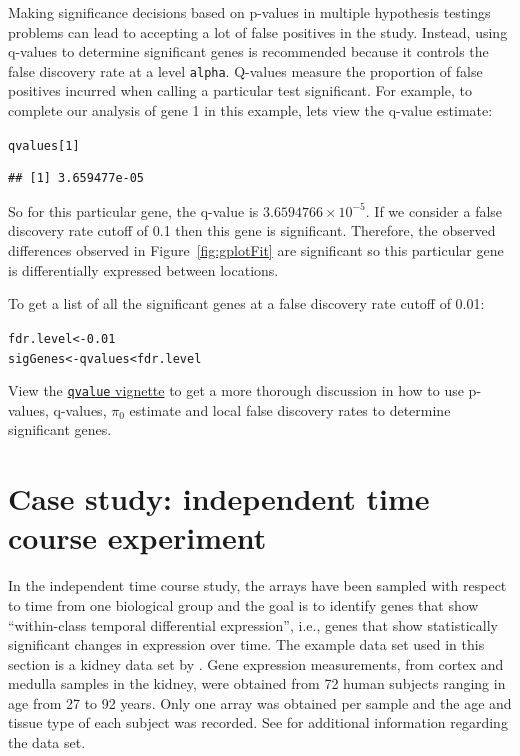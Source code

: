 \documentclass{article}\usepackage[]{graphicx}\usepackage[]{color}
\makeatletter
\newcommand{\hlnum}[1]{\textcolor[rgb]{0.686,0.059,0.569}{#1}}%
\newcommand{\hlopt}[1]{\textcolor[rgb]{0,0,0}{#1}}%
\newcommand{\hlstd}[1]{\textcolor[rgb]{0.345,0.345,0.345}{#1}}%
\newcommand{\hlkwb}[1]{\textcolor[rgb]{0.69,0.353,0.396}{#1}}%
\newenvironment{kframe}{%
 \def\at@end@of@kframe{}%
 \ifinner\ifhmode%
  \def\at@end@of@kframe{\end{minipage}}%
  \begin{minipage}{\columnwidth}%
 \fi\fi%
 \def\FrameCommand##1{\hskip\@totalleftmargin \hskip-\fboxsep
 \colorbox{shadecolor}{##1}\hskip-\fboxsep
     \hskip-\linewidth \hskip-\@totalleftmargin \hskip\columnwidth}%
 \MakeFramed {\advance\hsize-\width
   \@totalleftmargin\z@ \linewidth\hsize
   \@setminipage}}%
 {\par\unskip\endMakeFramed%
 \at@end@of@kframe}
\newenvironment{knitrout}{}{} %
\makeatother
\begin{document}
Making significance decisions based on p-values in multiple hypothesis testings problems can lead to accepting a lot of false positives in the study. Instead, using q-values to determine significant genes is recommended because it controls the false discovery rate at a level {\tt alpha}. Q-values measure the proportion of false positives incurred when calling a particular test significant. For example, to complete our analysis of gene 1 in this example, lets view the q-value estimate:
\begin{knitrout}
\color{fgcolor}\begin{kframe}
\begin{alltt}
\hlstd{qvalues[}\hlnum{1}\hlstd{]}
\end{alltt}
\begin{verbatim}
## [1] 3.659477e-05
\end{verbatim}
\end{kframe}
\end{knitrout}

So for this particular gene, the q-value is \ensuremath{3.6594766\times 10^{-5}}. If we consider a false discovery rate cutoff of 0.1 then this gene is significant. Therefore, the observed differences observed in Figure~\ref{fig:gplotFit} are significant so this particular gene is differentially expressed between locations. 

To get a list of all the significant genes at a false discovery rate cutoff of 0.01:
\begin{knitrout}
\color{fgcolor}\begin{kframe}
\begin{alltt}
\hlstd{fdr.level} \hlkwb{<-} \hlnum{0.01}
\hlstd{sigGenes} \hlkwb{<-} \hlstd{qvalues} \hlopt{<} \hlstd{fdr.level}
\end{alltt}
\end{kframe}
\end{knitrout}

View the \href{http://www.bioconductor.org/packages/release/bioc/html/qvalue.html}{{\tt qvalue} vignette} to get a more thorough discussion in how to use p-values, q-values, $\pi_{0}$ estimate and local false discovery rates to determine significant genes.

\section{Case study: independent time course experiment}
\label{sec:kidney}
In the independent time course study, the arrays have been sampled with respect to time from one biological group and the goal is to identify genes that show ``within-class temporal differential expression'', i.e., genes that show statistically significant changes in expression over time. The example data set used in this section is a kidney data set by \cite{rodwell:2004}. Gene expression measurements, from cortex and medulla samples in the kidney, were obtained from 72 human subjects ranging in age from 27 to 92 years. Only one array was obtained per sample and the age and tissue type of each subject was recorded. See \cite{rodwell:2004} for additional information regarding the data set.
\end{document}
